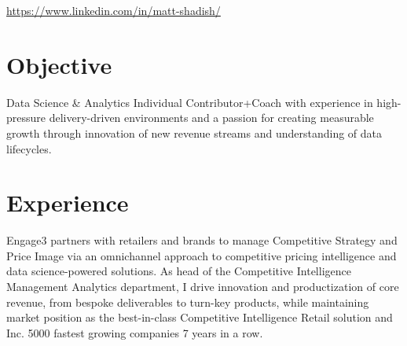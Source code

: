 \documentclass[]{deedy-resume-openfont}
\begin{document}
%
%

%
%



\href{https://www.linkedin.com/in/matt-shadish/}{https://www.linkedin.com/in/matt-shadish/}

\begin{comment}
\begin{center}
\huge\color{subheadings}\custombold{LIFELONG LEARNER}
\end{center}
\end{comment}


\section{Objective}
\begin{flushleft}
Data Science \& Analytics Individual Contributor+Coach with experience in high-pressure delivery-driven environments and a passion for creating measurable growth through innovation of new revenue streams and understanding of data lifecycles.
\end{flushleft}



\section{Experience}


\sectionsep





\sectionsep
Engage3 partners with retailers and brands to manage Competitive Strategy and Price Image via an omnichannel approach to competitive pricing intelligence and data science-powered solutions.  As head of the Competitive Intelligence Management Analytics department, I drive innovation and productization of core revenue, from bespoke deliverables to turn-key products, while maintaining market position as the best-in-class Competitive Intelligence Retail solution and Inc. 5000 fastest growing companies 7 years in a row.
\end{document}
